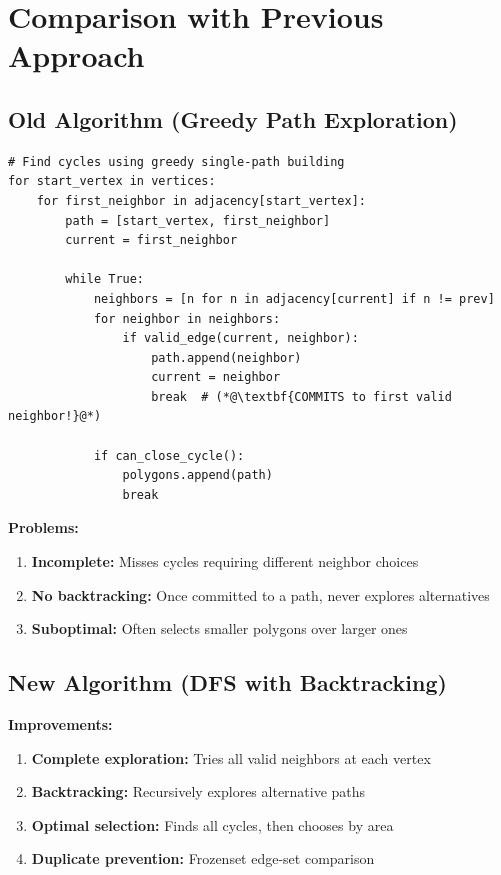 \documentclass[11pt]{article}
\begin{document}
\section{Comparison with Previous Approach}

\subsection{Old Algorithm (Greedy Path Exploration)}

\begin{lstlisting}[caption={Old greedy approach},label={lst:oldapproach}]
# Find cycles using greedy single-path building
for start_vertex in vertices:
    for first_neighbor in adjacency[start_vertex]:
        path = [start_vertex, first_neighbor]
        current = first_neighbor
        
        while True:
            neighbors = [n for n in adjacency[current] if n != prev]
            for neighbor in neighbors:
                if valid_edge(current, neighbor):
                    path.append(neighbor)
                    current = neighbor
                    break  # (*@\textbf{COMMITS to first valid neighbor!}@*)
            
            if can_close_cycle():
                polygons.append(path)
                break
\end{lstlisting}

\textbf{Problems:}
\begin{enumerate}
    \item \textbf{Incomplete:} Misses cycles requiring different neighbor choices
    \item \textbf{No backtracking:} Once committed to a path, never explores alternatives
    \item \textbf{Suboptimal:} Often selects smaller polygons over larger ones
\end{enumerate}

\subsection{New Algorithm (DFS with Backtracking)}

\textbf{Improvements:}
\begin{enumerate}
    \item \textbf{Complete exploration:} Tries all valid neighbors at each vertex
    \item \textbf{Backtracking:} Recursively explores alternative paths
    \item \textbf{Optimal selection:} Finds all cycles, then chooses by area
    \item \textbf{Duplicate prevention:} Frozenset edge-set comparison
\end{enumerate}
\end{document}
